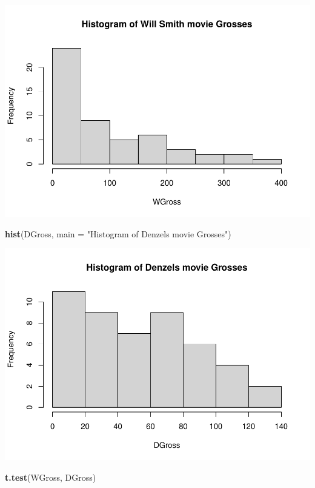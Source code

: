 \documentclass[]{article}
\newenvironment{Shaded}{\begin{snugshade}}{\end{snugshade}}
\newcommand{\DataTypeTok}[1]{\textcolor[rgb]{0.13,0.29,0.53}{#1}}
\newcommand{\KeywordTok}[1]{\textcolor[rgb]{0.13,0.29,0.53}{\textbf{#1}}}
\newcommand{\NormalTok}[1]{#1}
\newcommand{\StringTok}[1]{\textcolor[rgb]{0.31,0.60,0.02}{#1}}
\begin{document}
\includegraphics{Denzel-v-Will-data_files/figure-latex/unnamed-chunk-5-3.pdf}

\begin{Shaded}
\begin{Highlighting}[]
\KeywordTok{hist}\NormalTok{(DGross, }\DataTypeTok{main =} \StringTok{"Histogram of Denzels movie Grosses"}\NormalTok{)}
\end{Highlighting}
\end{Shaded}

\includegraphics{Denzel-v-Will-data_files/figure-latex/unnamed-chunk-5-4.pdf}

\begin{Shaded}
\begin{Highlighting}[]
\KeywordTok{t.test}\NormalTok{(WGross, DGross)}
\end{Highlighting}
\end{Shaded}
\end{document}
